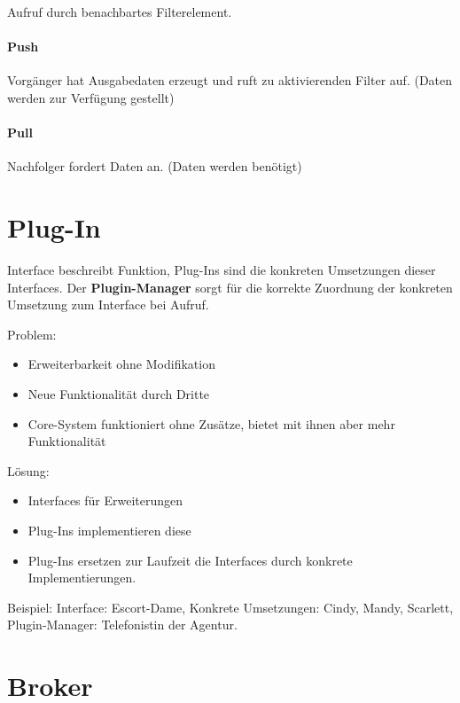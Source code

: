 Aufruf durch benachbartes Filterelement.

\paragraph{Push}\label{push}

Vorgänger hat Ausgabedaten erzeugt und ruft zu aktivierenden Filter auf.
(Daten werden zur Verfügung gestellt)

\paragraph{Pull}\label{pull}

Nachfolger fordert Daten an. (Daten werden benötigt)

\section{Plug-In}\label{plug-in}

Interface beschreibt Funktion, Plug-Ins sind die konkreten Umsetzungen
dieser Interfaces. Der \textbf{Plugin-Manager} sorgt für die korrekte Zuordnung
der konkreten Umsetzung zum Interface bei Aufruf.

Problem:

\begin{itemize}
\itemsep1pt\parskip0pt
\item
  Erweiterbarkeit ohne Modifikation
\item
  Neue Funktionalität durch Dritte
\item
  Core-System funktioniert ohne Zusätze, bietet mit ihnen aber mehr
  Funktionalität
\end{itemize}

Lösung:

\begin{itemize}
\itemsep1pt\parskip0pt
\item
  Interfaces für Erweiterungen
\item
  Plug-Ins implementieren diese
\item
  Plug-Ins ersetzen zur Laufzeit die Interfaces durch konkrete
  Implementierungen.
\end{itemize}

Beispiel: Interface: Escort-Dame, Konkrete Umsetzungen: Cindy, Mandy,
Scarlett, Plugin-Manager: Telefonistin der Agentur.

\section{Broker}\label{broker}

